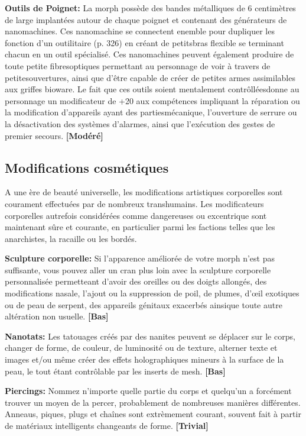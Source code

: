 \textbf{Outils de Poignet:} La morph possède des bandes métalliques de 6 centimètres de large implantées autour de chaque poignet et contenant des générateurs de nanomachines.  Ces nanomachine se connectent enemble pour dupliquer les fonction d'un outilitaire (p. 326) en créant de petitsbras flexible se terminant chacun en un outil spécialisé. Ces nanomachines peuvent également produire de toute petite fibresoptiques permettant au personnage de voir à travers de petitesouvertures, ainsi que d'être capable de créer de petites armes assimilables aux griffes bioware. Le fait que ces outils soient mentalement contrôlléesdonne au personnage un modificateur de +20 aux compétences impliquant la réparation ou la modification d'appareils ayant des partiesmécanique, l'ouverture de serrure ou la désactivation des systèmes d'alarmes, ainsi que l'exécution des gestes de premier secours. \textbf{[Modéré]} 



\subsection{Modifications cosmétiques} \label{sec:cosmetic-mods} 

A une ère de beauté universelle, les modifications artistiques corporelles sont courament effectuées par de nombreux transhumains. Les modificateurs corporelles autrefois considérées comme dangereuses ou excentrique sont maintenant sûre et courante, en particulier parmi les factions telles que les anarchistes, la racaille ou les bordés. 

\textbf{Sculpture corporelle:} Si l'apparence améliorée de votre morph n'est pas suffisante, vous pouvez aller un cran plus loin avec la sculpture corporelle personnalisée permetteant d'avoir des oreilles ou des doigts allongés, des modifications nasale, l'ajout ou la suppression de poil, de plumes, d'œil exotiques ou de peau de serpent, des appareils génitaux exacerbés ainsique toute autre altération non usuelle. \textbf{[Bas]} 

\textbf{Nanotats:} Les tatouages créés par des nanites peuvent se déplacer sur le corps, changer de forme, de couleur, de luminosité ou de texture, alterner texte et images et/ou même créer des effets holographiques mineurs à la surface de la peau, le tout étant contrôlable par les inserts de mesh. \textbf{[Bas]} 

\textbf{Piercings:} Nommez n'importe quelle partie du corps et quelqu'un a forcément trouver un moyen de la percer, probablement de nombreuses manières différentes. Anneaus, piques, plugs et chaînes sont extrèmement courant, souvent fait à partir de matériaux intelligents changeants de forme. \textbf{[Trivial]} 

